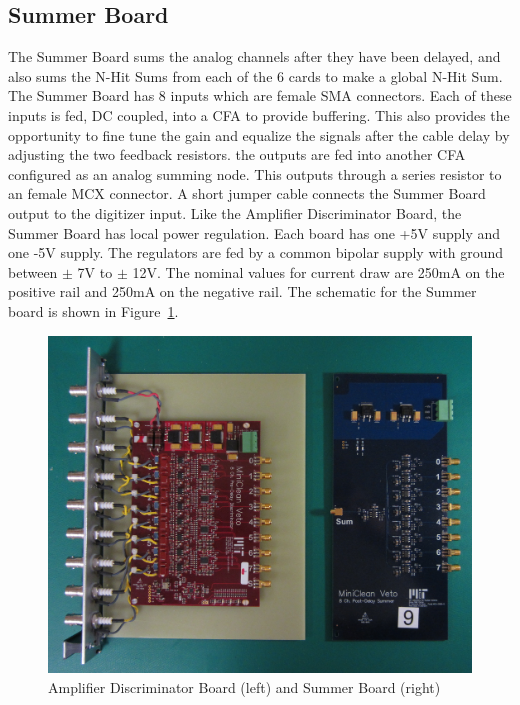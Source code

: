 \documentclass[preprint,12pt]{elsarticle}
\begin{document}
\subsection{Summer Board}
\label{sec:Sum}
%
The Summer Board sums the analog channels after they have been
delayed, and also sums the N-Hit Sums from each of the 6 cards to make
a global N-Hit Sum.  The Summer Board has 8 inputs which are female
SMA connectors.  Each of these inputs is fed, DC coupled, into a CFA
to provide buffering.  This also provides the opportunity to fine tune
the gain and equalize the signals after the cable delay by adjusting
the two feedback resistors.  the outputs are fed into another CFA
configured as an analog summing node.  This outputs through a series
resistor to an female MCX connector.  A short jumper cable connects
the Summer Board output to the digitizer input.  Like the Amplifier
Discriminator Board, the Summer Board has local power regulation.
Each board has one +5V supply and one -5V supply.  The regulators are
fed by a common bipolar supply with ground between $\pm$ 7V to $\pm$
12V.  The nominal values for current draw are 250mA on the positive
rail and 250mA on the negative rail.  The schematic for the Summer
board is shown in Figure~\ref{fig:boards}.

\begin{figure}[h]
\begin{center}
\includegraphics[width=5in, keepaspectratio=true]{graphics/boards}
\caption{Amplifier Discriminator Board (left) and Summer Board (right)}
\label{fig:boards}
\end{center}
\end{figure}
\end{document}
